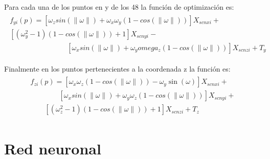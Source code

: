        	Para cada una de los puntos en y de los 48 la función de optimización es:
       	\begin{eqnarray}
       	\begin{array}{c}
       	f_{yi}(p)=[\omega_zsin(\parallel\omega\parallel)+\omega_x\omega_y(1-cos(\parallel\omega\parallel))]X_{scnxi}+\\
       	\left[(\omega_y^2-1)(1-cos(\parallel\omega\parallel))+1\right]X_{scnyi}-\\
       	\qquad \qquad \qquad \qquad
       	\left[\omega_xsin(\parallel\omega\parallel)+\omega_y omega_z(1-cos(\parallel\omega\parallel))\right]X_{scnzi}+T_y
       	\end{array}
       	\end{eqnarray}
       	
       	Finalmente en los puntos pertenecientes a la coordenada z la función es:
       	\begin{eqnarray}
       	\begin{array}{c}
       	f_{zi}(p)=[\omega_x\omega_z(1-cos(\parallel\omega\parallel))-\omega_y\sin(\omega)]X_{scnxi}+\\
       	\qquad \qquad
       	\left[\omega_xsin(\parallel\omega\parallel)+\omega_y\omega_z(1-cos(\parallel\omega\parallel))\right]X_{scnyi}+\\
       	\qquad	
       	\left[(\omega_z^2-1)(1-cos(\parallel\omega\parallel))+1\right]X_{scnzi}+T_z
       	\end{array}
       	\end{eqnarray}
 
 


\section{Red neuronal}
    